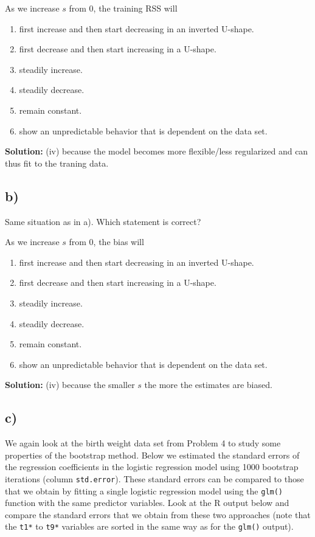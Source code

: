 \documentclass[
]{article}
\providecommand{\tightlist}{%
  \setlength{\itemsep}{0pt}\setlength{\parskip}{0pt}}
\begin{document}
As we increase \(s\) from 0, the training RSS will

\begin{enumerate}
\def\labelenumi{(\roman{enumi})}
\tightlist
\item
  first increase and then start decreasing in an inverted U-shape.
\item
  first decrease and then start increasing in a U-shape.
\item
  steadily increase.
\item
  steadily decrease.
\item
  remain constant.
\item
  show an unpredictable behavior that is dependent on the data set.
\end{enumerate}

\textbf{Solution:} (iv) because the model becomes more flexible/less
regularized and can thus fit to the traning data.

\hypertarget{b}{%
\subsection{b)}\label{b}}

Same situation as in a). Which statement is correct?

As we increase \(s\) from 0, the bias will

\begin{enumerate}
\def\labelenumi{(\roman{enumi})}
\tightlist
\item
  first increase and then start decreasing in an inverted U-shape.
\item
  first decrease and then start increasing in a U-shape.
\item
  steadily increase.
\item
  steadily decrease.
\item
  remain constant.
\item
  show an unpredictable behavior that is dependent on the data set.
\end{enumerate}

\textbf{Solution:} (iv) because the smaller \(s\) the more the estimates
are biased.

\clearpage

\hypertarget{c}{%
\subsection{c)}\label{c}}

We again look at the birth weight data set from Problem 4 to study some
properties of the bootstrap method. Below we estimated the standard
errors of the regression coefficients in the logistic regression model
using 1000 bootstrap iterations (column \texttt{std.error}). These
standard errors can be compared to those that we obtain by fitting a
single logistic regression model using the \texttt{glm()} function with
the same predictor variables. Look at the R output below and compare the
standard errors that we obtain from these two approaches (note that the
\texttt{t1*} to \texttt{t9*} variables are sorted in the same way as for
the \texttt{glm()} output).
\end{document}
